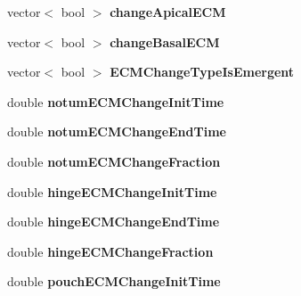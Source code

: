 \begin{DoxyCompactItemize}
\item 
\hypertarget{classSimulation_a1dacf4181df6a03b88df505bd66f45ab}{}vector$<$ bool $>$ {\bfseries change\+Apical\+E\+C\+M}\label{classSimulation_a1dacf4181df6a03b88df505bd66f45ab}

\item 
\hypertarget{classSimulation_a3e99922d495461df04933d4fa05669aa}{}vector$<$ bool $>$ {\bfseries change\+Basal\+E\+C\+M}\label{classSimulation_a3e99922d495461df04933d4fa05669aa}

\item 
\hypertarget{classSimulation_a14ea2a8ba2d80014c1a5b05a4de16b1e}{}vector$<$ bool $>$ {\bfseries E\+C\+M\+Change\+Type\+Is\+Emergent}\label{classSimulation_a14ea2a8ba2d80014c1a5b05a4de16b1e}

\item 
\hypertarget{classSimulation_a3dc8a1c0e41aa8cde9865604b27a4226}{}double {\bfseries notum\+E\+C\+M\+Change\+Init\+Time}\label{classSimulation_a3dc8a1c0e41aa8cde9865604b27a4226}

\item 
\hypertarget{classSimulation_a45f2a57f59d39995424b7c32ae11fa8c}{}double {\bfseries notum\+E\+C\+M\+Change\+End\+Time}\label{classSimulation_a45f2a57f59d39995424b7c32ae11fa8c}

\item 
\hypertarget{classSimulation_ade4797ce6928843e8871f25adea46f6e}{}double {\bfseries notum\+E\+C\+M\+Change\+Fraction}\label{classSimulation_ade4797ce6928843e8871f25adea46f6e}

\item 
\hypertarget{classSimulation_ae6491c62b99ae31c0a5bd2b5e3383bfd}{}double {\bfseries hinge\+E\+C\+M\+Change\+Init\+Time}\label{classSimulation_ae6491c62b99ae31c0a5bd2b5e3383bfd}

\item 
\hypertarget{classSimulation_a1dac775eb4843f0cf562aa574664a14f}{}double {\bfseries hinge\+E\+C\+M\+Change\+End\+Time}\label{classSimulation_a1dac775eb4843f0cf562aa574664a14f}

\item 
\hypertarget{classSimulation_a2fcc51c4065261a6fa1308e40d6c18d2}{}double {\bfseries hinge\+E\+C\+M\+Change\+Fraction}\label{classSimulation_a2fcc51c4065261a6fa1308e40d6c18d2}

\item 
\hypertarget{classSimulation_abe2da9f9cfd0abfe8d4530cc332f301d}{}double {\bfseries pouch\+E\+C\+M\+Change\+Init\+Time}\label{classSimulation_abe2da9f9cfd0abfe8d4530cc332f301d}


\end{DoxyCompactItemize}
